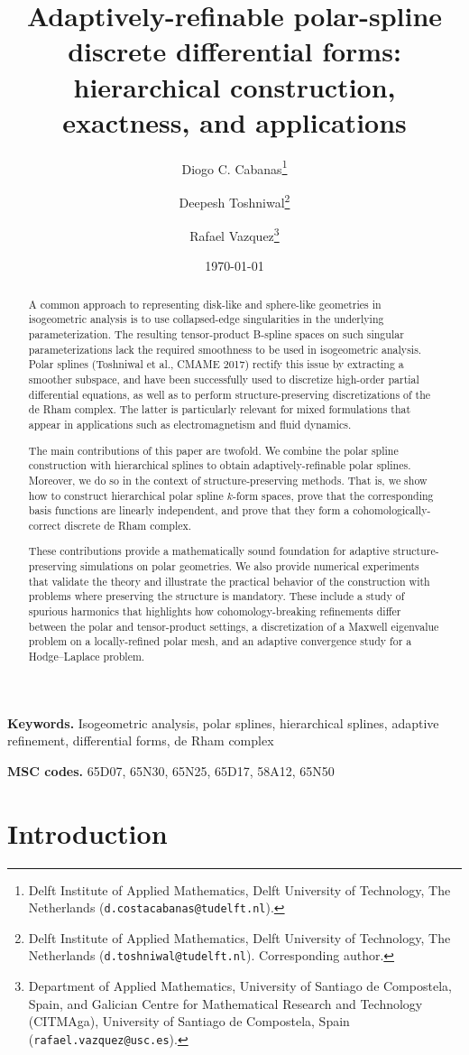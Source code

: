 \documentclass[10pt]{article}
\title{Adaptively-refinable polar-spline discrete differential forms:\\
  hierarchical construction, exactness, and applications}
\author{%
  Diogo C. Cabanas\thanks{Delft Institute of Applied Mathematics, Delft
    University of Technology, The Netherlands
    (\texttt{d.costacabanas@tudelft.nl}).}
  \and Deepesh Toshniwal\thanks{Delft Institute of Applied Mathematics, Delft
    University of Technology, The Netherlands
    (\texttt{d.toshniwal@tudelft.nl}). Corresponding author.}
  \and Rafael Vazquez\thanks{Department of Applied Mathematics, University of
    Santiago de Compostela, Spain, and Galician Centre for Mathematical Research
    and Technology (CITMAga), University of Santiago de Compostela, Spain
    (\texttt{rafael.vazquez@usc.es}).}%
}
\date{\today}
\theoremstyle{plain}
\theoremstyle{definition}
\theoremstyle{remark}
\begin{document}
\maketitle

\begin{abstract}
	A common approach to representing disk-like and sphere-like geometries in isogeometric analysis is to use collapsed-edge singularities in the underlying parameterization.
	The resulting tensor-product B-spline spaces on such singular parameterizations lack the required smoothness to be used in isogeometric analysis.
	Polar splines (Toshniwal et al., CMAME 2017) rectify this issue by extracting a smoother subspace, and have been successfully used to discretize high-order partial differential equations, as well as to perform structure-preserving discretizations of the de Rham complex.
	The latter is particularly relevant for mixed formulations that appear in applications such as electromagnetism and fluid dynamics.

	The main contributions of this paper are twofold.
	We combine the polar spline construction with hierarchical splines to obtain adaptively-refinable polar splines.
	Moreover, we do so in the context of structure-preserving methods.
	That is, we show how to construct hierarchical polar spline $k$-form spaces, prove that the corresponding basis functions are linearly independent, and prove that they form a cohomologically-correct discrete de Rham complex.

	These contributions provide a mathematically sound foundation for adaptive structure-preserving simulations on polar geometries.
	We also provide numerical experiments that validate the theory and illustrate the practical behavior of the construction with problems where preserving the structure is mandatory.
	These include a study of spurious harmonics that highlights how cohomology-breaking refinements differ between the polar and tensor-product settings, a discretization of a Maxwell eigenvalue problem on a locally-refined polar mesh, and an adaptive convergence study for a Hodge--Laplace problem.
\end{abstract}

\noindent\textbf{Keywords.}
Isogeometric analysis, polar splines, hierarchical splines, adaptive refinement, differential forms, de Rham complex

\smallskip
\noindent\textbf{MSC codes.}
65D07, 65N30, 65N25, 65D17, 58A12, 65N50

\section{Introduction}
\label{sec:introduction}
\end{document}
